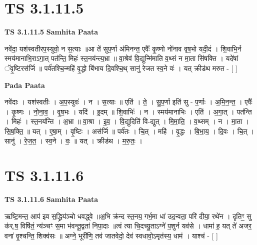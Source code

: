 \documentclass[17pt]{extarticle}
\begin{document}
\section*{ TS 3.1.11.5 }

\textbf{TS 3.1.11.5 } \newline
\textbf{Samhita Paata} \newline

नवे॑दा॒ यश॑स्वतीरप॒स्युवो॒ न स॒त्याः ॥आ ते॑ सुप॒र्णा अ॑मिनन्त॒ एवैः᳚ कृ॒ष्णो नो॑नाव वृष॒भो यदी॒दं । शि॒वाभि॒र्न स्मय॑मानाभि॒राऽगा॒त् पत॑न्ति॒ मिहः॑ स्त॒नय॑न्त्य॒भ्रा ॥ वा॒श्रेव॑ वि॒द्युन्मि॑माति व॒थ्सं न मा॒ता सि॑षक्ति । यदे॑षां ॅवृ॒ष्टिरस॑र्जि ॥ पर्व॑तश्चि॒न्महि॑ वृ॒द्धो बि॑भाय दि॒वश्चि॒थ् सानु॑ रेजत स्व॒ने वः॑ । यत् क्रीड॑थ मरुत - [  ] \newline

\textbf{Pada Paata} \newline

नवे॑दाः । यश॑स्वतीः । अ॒प॒स्युवः॑ । न । स॒त्याः ॥ एति॑ । ते॒ । सु॒प॒र्णा इति॑ सु - प॒र्णाः । अ॒मि॒न॒न्त॒ । एवैः᳚ । कृ॒ष्णः । नो॒ना॒व॒ । वृ॒ष॒भः । यदि॑ । इ॒दम् ॥ शि॒वाभिः॑ । न । स्मय॑मानाभिः । एति॑ । अ॒गा॒त् । पत॑न्ति । मिहः॑ । स्त॒नय॑न्ति । अ॒भ्रा ॥ वा॒श्रा । इ॒व॒ । वि॒द्युदिति॑ वि-द्युत् । मि॒मा॒ति॒ । व॒थ्सम् । न । मा॒ता । सि॒ष॒क्ति॒ ॥ यत् । ए॒षा॒म् । वृ॒ष्टिः । अस॑र्जि ॥ पर्व॑तः । चि॒त् । महि॑ । वृ॒द्धः । बि॒भा॒य॒ । दि॒वः । चि॒त् । सानु॑ । रे॒ज॒त॒ । स्व॒ने । वः॒ ॥ यत् । क्रीड॑थ । म॒रु॒तः॒ ।  \newline




\section*{ TS 3.1.11.6 }

\textbf{TS 3.1.11.6 } \newline
\textbf{Samhita Paata} \newline

ऋष्टि॒मन्त॒ आप॑ इव स॒द्ध्रिय॑ञ्चो धवद्ध्वे ॥अ॒भि क्र॑न्द स्त॒नय॒ गर्भ॒मा धा॑ उद॒न्वता॒ परि॑ दीया॒ रथे॑न । दृतिꣳ॒॒ सु क॑र्.ष॒ विषि॑तं॒ न्य॑ञ्चꣳ स॒मा भ॑वन्तू॒द्वता॑ निपा॒दाः ॥त्वं त्या चि॒दच्यु॒ताऽग्ने॑ प॒शुर्न यव॑से । धामा॑ ह॒ यत् ते॑ अजर॒ वना॑ वृ॒श्चन्ति॒ शिक्व॑सः ॥ अग्ने॒ भूरी॑णि॒ तव॑ जातवेदो॒ देव॑ स्वधावो॒ऽमृत॑स्य॒ धाम॑ । याश्च॑ - [  ] \newline
\end{document}
